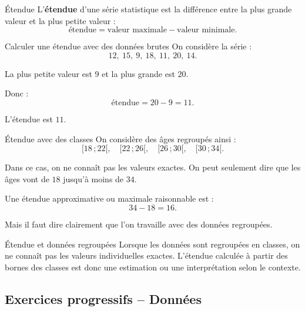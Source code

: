 \documentclass[11pt,a4paper]{article}
\newcommand{\intervalle}[2]{\ensuremath{[#1\,;#2[}}
\begin{document}
\begin{definitionbox}{Étendue}
L'\textbf{étendue} d'une série statistique est la différence entre la plus grande valeur et la plus petite valeur :
\[
\text{étendue}=\text{valeur maximale}-\text{valeur minimale}.
\]
\end{definitionbox}

\begin{examplebox}{Calculer une étendue avec des données brutes}
On considère la série :
\[
12,\ 15,\ 9,\ 18,\ 11,\ 20,\ 14.
\]

La plus petite valeur est $9$ et la plus grande est $20$.

Donc :
\[
\text{étendue}=20-9=11.
\]

L'étendue est $11$.
\end{examplebox}

\begin{examplebox}{Étendue avec des classes}
On considère des âges regroupés ainsi :
\[
\intervalle{18}{22},\quad \intervalle{22}{26},\quad \intervalle{26}{30},\quad \intervalle{30}{34}.
\]

Dans ce cas, on ne connaît pas les valeurs exactes. On peut seulement dire que les âges vont de $18$ jusqu'à moins de $34$.

Une étendue approximative ou maximale raisonnable est :
\[
34-18=16.
\]

Mais il faut dire clairement que l'on travaille avec des données regroupées.
\end{examplebox}

\begin{warningbox}{Étendue et données regroupées}
Lorsque les données sont regroupées en classes, on ne connaît pas les valeurs individuelles exactes. L'étendue calculée à partir des bornes des classes est donc une estimation ou une interprétation selon le contexte.
\end{warningbox}

\subsection{Exercices progressifs -- Données}
\end{document}
